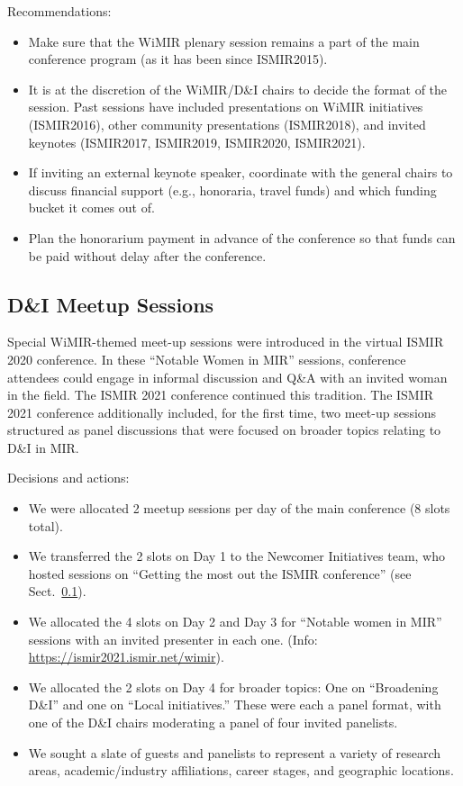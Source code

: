 \documentclass[%
10pt,								%
]
{scrartcl}
\begin{document}
            Recommendations:
            \begin{itemize}
                \item   Make sure that the WiMIR plenary session remains a part of the main conference program (as it has been since ISMIR2015). 
                \item   It is at the discretion of the WiMIR/D\&I chairs to decide the format of the session. Past sessions have included presentations on WiMIR initiatives (ISMIR2016), other community presentations (ISMIR2018), and invited keynotes (ISMIR2017, ISMIR2019, ISMIR2020, ISMIR2021). 
                \item   If inviting an external keynote speaker, coordinate with the general chairs to discuss financial support (e.g., honoraria, travel funds) and which funding bucket it comes out of.
                \item   Plan the honorarium payment in advance of the conference so that funds can be paid without delay after the conference.
            \end{itemize}

    \subsection{D\&I Meetup Sessions}
        Special WiMIR-themed meet-up sessions were introduced in the virtual ISMIR 2020 conference. In these ``Notable Women in MIR'' sessions, conference attendees could engage in informal discussion and Q\&A with an invited woman in the field. The ISMIR 2021 conference continued this tradition. The ISMIR 2021 conference additionally included, for the first time, two meet-up sessions structured as panel discussions that were focused on broader topics relating to D\&I in MIR.
        
            Decisions and actions:
            \begin{itemize}
                \item   We were allocated 2 meetup sessions per day of the main conference (8 slots total).
                \item   We transferred the 2 slots on Day 1 to the Newcomer Initiatives team, who hosted sessions on ``Getting the most out the ISMIR conference'' (see Sect.~\ref{}).
                \item   We allocated the 4 slots on Day 2 and Day 3 for ``Notable women in MIR'' sessions with an invited presenter in each one. (Info: \href{https://ismir2021.ismir.net/wimir}{https://ismir2021.ismir.net/wimir}).
                \item   We allocated the 2 slots on Day 4 for broader topics: One on ``Broadening D\&I'' and one on ``Local initiatives.'' These were each a panel format, with one of the D\&I chairs moderating a panel of four invited panelists.
                \item   We sought a slate of guests and panelists to represent a variety of research areas, academic/industry affiliations, career stages, and geographic locations.
            \end{itemize}
\end{document}
